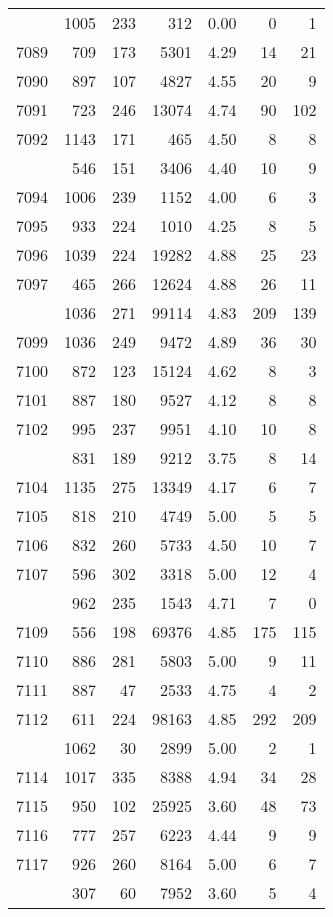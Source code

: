 \documentclass[
]{article}
\begin{document}
\begin{table}
\begin{tabular}[t]{lrrrrrr}
\addlinespace
7088 & 1005 & 233 & 312 & 0.00 & 0 & 1\\
7089 & 709 & 173 & 5301 & 4.29 & 14 & 21\\
7090 & 897 & 107 & 4827 & 4.55 & 20 & 9\\
7091 & 723 & 246 & 13074 & 4.74 & 90 & 102\\
7092 & 1143 & 171 & 465 & 4.50 & 8 & 8\\
\addlinespace
7093 & 546 & 151 & 3406 & 4.40 & 10 & 9\\
7094 & 1006 & 239 & 1152 & 4.00 & 6 & 3\\
7095 & 933 & 224 & 1010 & 4.25 & 8 & 5\\
7096 & 1039 & 224 & 19282 & 4.88 & 25 & 23\\
7097 & 465 & 266 & 12624 & 4.88 & 26 & 11\\
\addlinespace
7098 & 1036 & 271 & 99114 & 4.83 & 209 & 139\\
7099 & 1036 & 249 & 9472 & 4.89 & 36 & 30\\
7100 & 872 & 123 & 15124 & 4.62 & 8 & 3\\
7101 & 887 & 180 & 9527 & 4.12 & 8 & 8\\
7102 & 995 & 237 & 9951 & 4.10 & 10 & 8\\
\addlinespace
7103 & 831 & 189 & 9212 & 3.75 & 8 & 14\\
7104 & 1135 & 275 & 13349 & 4.17 & 6 & 7\\
7105 & 818 & 210 & 4749 & 5.00 & 5 & 5\\
7106 & 832 & 260 & 5733 & 4.50 & 10 & 7\\
7107 & 596 & 302 & 3318 & 5.00 & 12 & 4\\
\addlinespace
7108 & 962 & 235 & 1543 & 4.71 & 7 & 0\\
7109 & 556 & 198 & 69376 & 4.85 & 175 & 115\\
7110 & 886 & 281 & 5803 & 5.00 & 9 & 11\\
7111 & 887 & 47 & 2533 & 4.75 & 4 & 2\\
7112 & 611 & 224 & 98163 & 4.85 & 292 & 209\\
\addlinespace
7113 & 1062 & 30 & 2899 & 5.00 & 2 & 1\\
7114 & 1017 & 335 & 8388 & 4.94 & 34 & 28\\
7115 & 950 & 102 & 25925 & 3.60 & 48 & 73\\
7116 & 777 & 257 & 6223 & 4.44 & 9 & 9\\
7117 & 926 & 260 & 8164 & 5.00 & 6 & 7\\
\addlinespace
7118 & 307 & 60 & 7952 & 3.60 & 5 & 4\\

\end{tabular}
\end{table}
\end{document}
